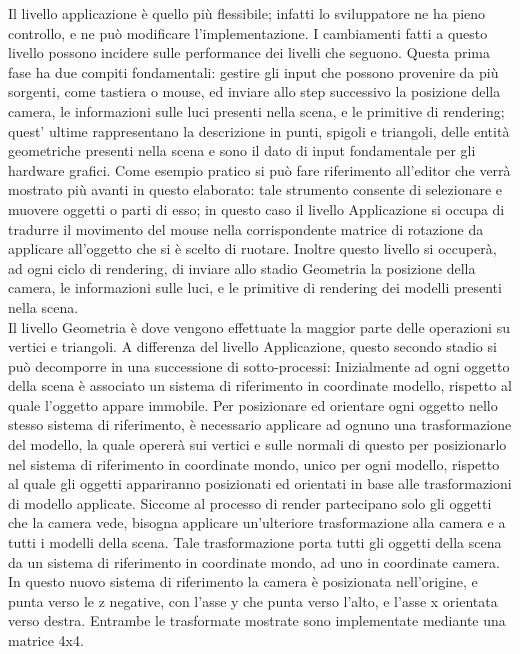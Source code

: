 Il livello applicazione è quello più flessibile; infatti lo sviluppatore ne ha pieno controllo, e ne può modificare l’implementazione. I cambiamenti fatti a questo livello possono incidere sulle performance dei livelli che seguono. 
Questa prima fase ha due compiti fondamentali: gestire gli input che possono provenire da più sorgenti, come tastiera o mouse, ed inviare allo step successivo la posizione della camera, le informazioni sulle luci presenti nella scena, e le primitive di rendering; quest’ ultime rappresentano la descrizione in punti, spigoli e triangoli, delle entità geometriche presenti nella scena e sono il dato di input fondamentale per gli hardware grafici. 
Come esempio pratico si può fare riferimento all’editor che verrà mostrato più avanti in questo elaborato: tale strumento consente di selezionare e muovere oggetti o parti di esso; in questo caso il livello Applicazione si occupa di tradurre il movimento del mouse nella corrispondente matrice di rotazione da applicare all’oggetto che si è scelto di ruotare. Inoltre questo livello si occuperà, ad ogni ciclo di rendering, di inviare allo stadio Geometria la posizione della camera, le informazioni sulle luci, e le primitive di rendering dei modelli presenti nella scena.\\

Il livello Geometria è dove vengono effettuate la maggior parte delle operazioni su vertici e triangoli. A differenza del livello Applicazione, questo secondo stadio si può decomporre in una successione di sotto-processi:
Inizialmente ad ogni oggetto della scena è associato un sistema di riferimento in coordinate modello, rispetto al quale l’oggetto appare immobile. Per posizionare ed orientare ogni oggetto nello stesso sistema di riferimento, è necessario applicare ad ognuno una trasformazione del modello, la quale opererà sui vertici e sulle normali di questo per posizionarlo nel sistema di riferimento in coordinate mondo, unico per ogni modello, rispetto al quale gli oggetti appariranno posizionati ed orientati in base alle trasformazioni di modello applicate. Siccome al processo di render partecipano solo gli oggetti che la camera vede, bisogna applicare un’ulteriore trasformazione alla camera e a tutti i modelli della scena. Tale trasformazione porta tutti gli oggetti della scena da un sistema di riferimento in coordinate mondo, ad uno in coordinate camera. In questo nuovo sistema di riferimento la camera è posizionata nell’origine, e punta verso le z negative, con l’asse y che punta verso l’alto, e l’asse x orientata verso destra. Entrambe le trasformate mostrate sono implementate mediante una matrice 4x4. 

